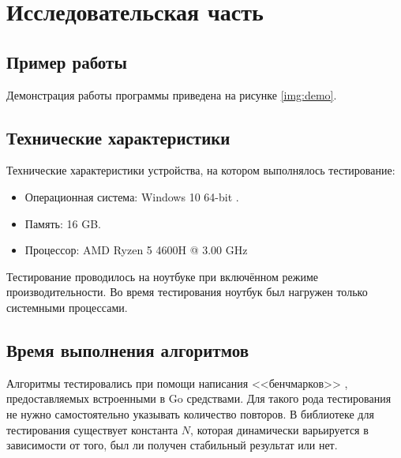 \chapter{Исследовательская часть}

\section{Пример работы}

Демонстрация работы программы приведена на рисунке \ref{img:demo}.


\section{Технические характеристики}

Технические характеристики устройства, на котором выполнялось тестирование:

\begin{itemize}
	\item Операционная система: Windows 10 64-bit \cite{windows}.
	\item Память: 16 GB.
	\item Процессор: AMD Ryzen 5 4600H \cite{amd} @ 3.00 GHz
\end{itemize}

Тестирование проводилось на ноутбуке при включённом режиме производительности. Во время тестирования ноутбук был нагружен только системными процессами.

\section{Время выполнения алгоритмов}

Алгоритмы тестировались при помощи написания <<бенчмарков>> \cite{gotest}, предоставляемых встроенными в Go средствами. Для такого рода тестирования не нужно самостоятельно указывать количество повторов. В библиотеке для тестирования существует константа $N$, которая динамически варьируется в зависимости от того, был ли получен стабильный результат или нет.

